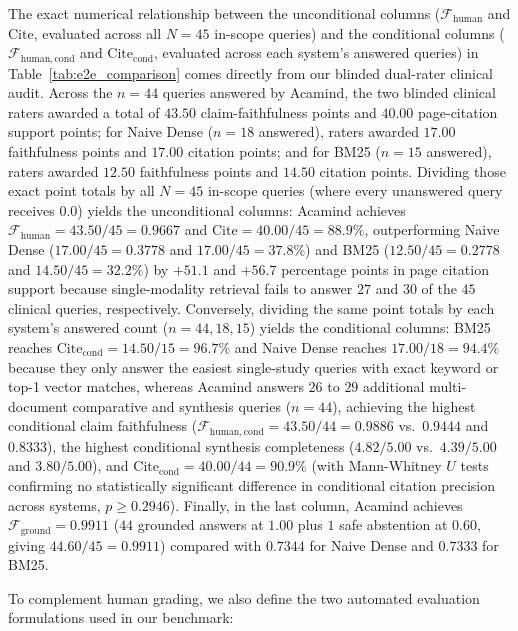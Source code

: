 \documentclass[10pt]{SPIIRAS_Proceedings}
\begin{document}
The exact numerical relationship between the unconditional columns ($\mathcal{F}_{\mathrm{human}}$ and $\mathrm{Cite}$, evaluated across all $N = 45$ in-scope queries) and the conditional columns ($\mathcal{F}_{\mathrm{human, cond}}$ and $\mathrm{Cite}_{\mathrm{cond}}$, evaluated across each system's answered queries) in Table~\ref{tab:e2e_comparison} comes directly from our blinded dual-rater clinical audit. Across the $n = 44$ queries answered by Acamind, the two blinded clinical raters awarded a total of $43.50$ claim-faithfulness points and $40.00$ page-citation support points; for Naive Dense ($n = 18$ answered), raters awarded $17.00$ faithfulness points and $17.00$ citation points; and for BM25 ($n = 15$ answered), raters awarded $12.50$ faithfulness points and $14.50$ citation points. Dividing those exact point totals by all $N = 45$ in-scope queries (where every unanswered query receives $0.0$) yields the unconditional columns: Acamind achieves $\mathcal{F}_{\mathrm{human}} = 43.50 / 45 = 0.9667$ and $\mathrm{Cite} = 40.00 / 45 = 88.9\%$, outperforming Naive Dense ($17.00 / 45 = 0.3778$ and $17.00 / 45 = 37.8\%$) and BM25 ($12.50 / 45 = 0.2778$ and $14.50 / 45 = 32.2\%$) by $+51.1$ and $+56.7$ percentage points in page citation support because single-modality retrieval fails to answer $27$ and $30$ of the $45$ clinical queries, respectively. Conversely, dividing the same point totals by each system's answered count ($n = 44, 18, 15$) yields the conditional columns: BM25 reaches $\mathrm{Cite}_{\mathrm{cond}} = 14.50 / 15 = 96.7\%$ and Naive Dense reaches $17.00 / 18 = 94.4\%$ because they only answer the easiest single-study queries with exact keyword or top-1 vector matches, whereas Acamind answers $26$ to $29$ additional multi-document comparative and synthesis queries ($n = 44$), achieving the highest conditional claim faithfulness ($\mathcal{F}_{\mathrm{human, cond}} = 43.50 / 44 = 0.9886$ vs.\ $0.9444$ and $0.8333$), the highest conditional synthesis completeness ($4.82 / 5.00$ vs.\ $4.39 / 5.00$ and $3.80 / 5.00$), and $\mathrm{Cite}_{\mathrm{cond}} = 40.00 / 44 = 90.9\%$ (with Mann-Whitney $U$ tests confirming no statistically significant difference in conditional citation precision across systems, $p \ge 0.2946$). Finally, in the last column, Acamind achieves $\mathcal{F}_{\mathrm{ground}} = 0.9911$ ($44$ grounded answers at $1.00$ plus $1$ safe abstention at $0.60$, giving $44.60 / 45 = 0.9911$) compared with $0.7344$ for Naive Dense and $0.7333$ for BM25.

To complement human grading, we also define the two automated evaluation formulations used in our benchmark:
\end{document}
